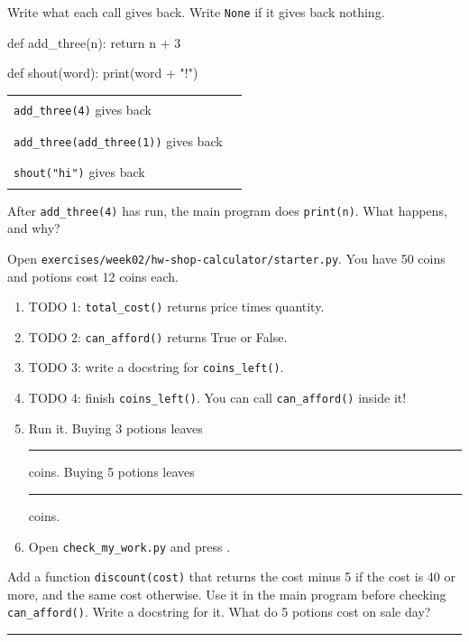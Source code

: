 \namedateline

\begin{core}
Write what each call gives back. Write \texttt{None} if it gives back nothing.
\begin{pycode}
def add_three(n):
    return n + 3

def shout(word):
    print(word + "!")
\end{pycode}
\begin{tabular}{@{}ll@{}}
\texttt{add\_three(4)} gives back & \rule{3cm}{0.4pt} \\[6pt]
\texttt{add\_three(add\_three(1))} gives back & \rule{3cm}{0.4pt} \\[6pt]
\texttt{shout("hi")} gives back & \rule{3cm}{0.4pt} \\
\end{tabular}\par
After \texttt{add\_three(4)} has run, the main program does \texttt{print(n)}. What happens, and why?
\end{core}

\begin{core}
Open \texttt{exercises/week02/hw-shop-calculator/starter.py}. You have 50 coins and potions cost 12 coins each.
\begin{enumerate}[leftmargin=1.4em]
  \item TODO 1: \texttt{total\_cost()} returns price times quantity.
  \item TODO 2: \texttt{can\_afford()} returns True or False.
  \item TODO 3: write a docstring for \texttt{coins\_left()}.
  \item TODO 4: finish \texttt{coins\_left()}. You can call \texttt{can\_afford()} inside it!
  \item Run it. Buying 3 potions leaves \rule{1.5cm}{0.4pt} coins. Buying 5 potions leaves \rule{1.5cm}{0.4pt} coins.
  \item Open \texttt{check\_my\_work.py} and press .
\end{enumerate}
\end{core}

\begin{challenge}
Add a function \texttt{discount(cost)} that returns the cost minus 5 if the cost is 40 or more, and the same cost otherwise.
Use it in the main program before checking \texttt{can\_afford()}. Write a docstring for it.
What do 5 potions cost on sale day? \rule{2cm}{0.4pt}
\end{challenge}

